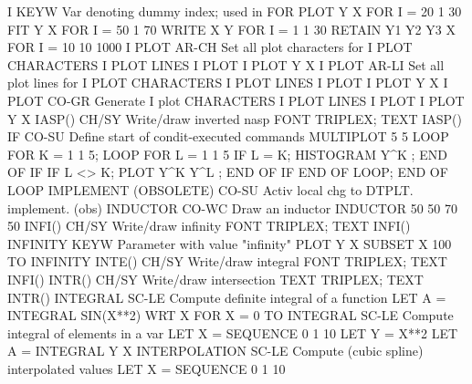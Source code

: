 I                           KEYW  Var denoting dummy index; used in FOR
                                  PLOT Y X FOR I = 20 1 30
                                  FIT Y X FOR I = 50 1 70
                                  WRITE X Y FOR I = 1 1 30
                                  RETAIN Y1 Y2 Y3 X FOR I = 10 10 1000
I PLOT                      AR-CH Set all plot characters for I PLOT
                                  CHARACTERS I PLOT
                                  LINES I PLOT
                                  I PLOT Y X
I PLOT                      AR-LI Set all plot lines for I PLOT
                                  CHARACTERS I PLOT
                                  LINES I PLOT
                                  I PLOT Y X
I PLOT                      CO-GR Generate I plot
                                  CHARACTERS I PLOT
                                  LINES I PLOT
                                  I PLOT Y X
IASP()                      CH/SY Write/draw inverted nasp
                                  FONT TRIPLEX; TEXT IASP()
IF                          CO-SU Define start of condit-executed commands
                                  MULTIPLOT 5 5
                                  LOOP FOR K = 1 1 5; LOOP FOR L = 1 1 5
                                  IF L = K; HISTOGRAM Y^K ; END OF IF
                                  IF L <> K; PLOT Y^K Y^L ; END OF IF
                                  END OF LOOP; END OF LOOP
IMPLEMENT (OBSOLETE)        CO-SU Activ local chg to DTPLT. implement. (obs)
INDUCTOR                    CO-WC Draw an inductor
                                  INDUCTOR 50 50 70 50
INFI()                      CH/SY Write/draw infinity
                                  FONT TRIPLEX; TEXT INFI()
INFINITY                    KEYW  Parameter with value "infinity"
                                  PLOT Y X SUBSET X 100 TO INFINITY
INTE()                      CH/SY Write/draw integral
                                  FONT TRIPLEX; TEXT INFI()
INTR()                      CH/SY Write/draw intersection
                                  TEXT TRIPLEX; TEXT INTR()
INTEGRAL                    SC-LE Compute definite integral of a function
                                  LET A = INTEGRAL SIN(X**2) WRT X FOR X = 0 TO
INTEGRAL                    SC-LE Compute integral of elements in a var
                                  LET X = SEQUENCE 0 1 10
                                  LET Y = X**2
                                  LET A = INTEGRAL Y X
INTERPOLATION               SC-LE Compute (cubic spline) interpolated values
                                  LET X = SEQUENCE 0 1 10

